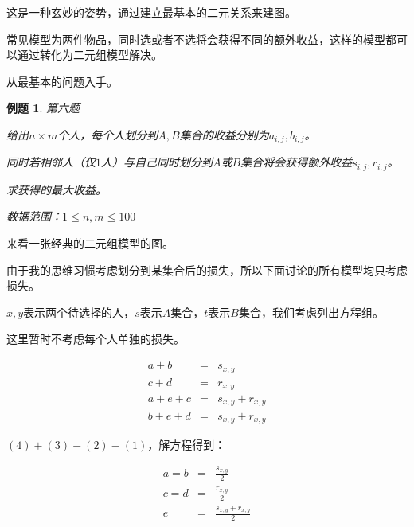 \documentclass[a4paper]{article}
\newtheorem{problem}{例题}
\begin{document}
这是一种玄妙的姿势，通过建立最基本的二元关系来建图。

常见模型为两件物品，同时选或者不选将会获得不同的额外收益，这样的模型都可以通过转化为二元组模型解决。

从最基本的问题入手。

\begin{problem}
  第六题

  给出$n\times m$个人，每个人划分到$A,B$集合的收益分别为$a_{i,j},b_{i,j}$。

  同时若相邻人（仅$1$人）与自己同时划分到$A$或$B$集合将会获得额外收益$s_{i,j},r_{i,j}$。

  求获得的最大收益。

  数据范围：$1\le n,m\le 100$
  
\end{problem}

来看一张经典的二元组模型的图。

\begin{figure}[htb]        
\end{figure}

由于我的思维习惯考虑划分到某集合后的损失，所以下面讨论的所有模型均只考虑损失。

$x,y$表示两个待选择的人，$s$表示$A$集合，$t$表示$B$集合，我们考虑列出方程组。

这里暂时不考虑每个人单独的损失。

\begin{eqnarray} 
  a+b &=& s_{x,y} \\
  c+d &=& r_{x,y} \\
  a+e+c &=& s_{x,y}+r_{x,y}\\
  b+e+d &=& s_{x,y}+r_{x,y}
\end{eqnarray}

$(4)+(3)-(2)-(1)$，解方程得到：

\begin{eqnarray*} 
  a = b &=& \frac{s_{x,y}}{2} \\
  c = d &=& \frac{r_{x,y}}{2} \\
  e &=& \frac{s_{x,y}+r_{x,y}}{2} 
\end{eqnarray*}
\end{document}
